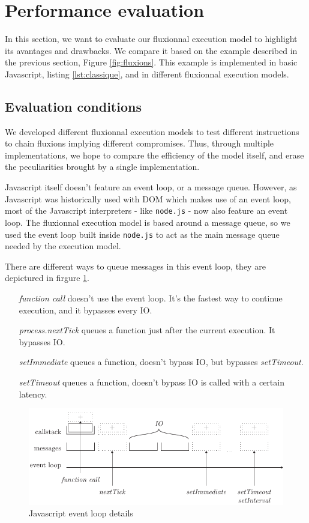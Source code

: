 \section{Performance evaluation}

In this section, we want to evaluate our fluxionnal execution model to highlight its avantages and drawbacks.
We compare it based on the example described in the previous section, Figure \ref{fig:fluxions}.
This example is implemented in basic Javascript, listing \ref{lst:classique}, and in different fluxionnal execution models.

\subsection{Evaluation conditions}

We developed different fluxionnal execution models to test different instructions to chain fluxions implying different compromises.
Thus, through multiple implementations, we hope to compare the efficiency of the model itself, and erase the peculiarities brought by a single implementation.

Javascript itself doesn't feature an event loop, or a message queue.
However, as Javascript was historically used with DOM which makes use of an event loop, most of the Javascript interpreters - like \texttt{node.js} - now also feature an event loop.
The fluxionnal execution model is based around a message queue, so we used the event loop built inside \texttt{node.js} to act as the main message queue needed by the execution model.

There are different ways to queue messages in this event loop, they are depictured in firgure \ref{fig:eventloop}.
\begin{itemize}
	\item[\textit{function call}] doesn't use the event loop. It's the fastest way to continue execution, and it bypasses every IO.
	\item[\textit{process.nextTick}] queues a function just after the current execution. It bypasses IO.
	\item[\textit{setImmediate}] queues a function, doesn't bypass IO, but bypasses \textit{setTimeout}.
	\item[\textit{setTimeout}] queues a function, doesn't bypass IO is called with a certain latency.
\end{itemize}

\begin{figure}[h!]
  \includegraphics[width=\linewidth]{eventloop.pdf}
  \caption{Javascript event loop details}
  \label{fig:eventloop}
\end{figure}

